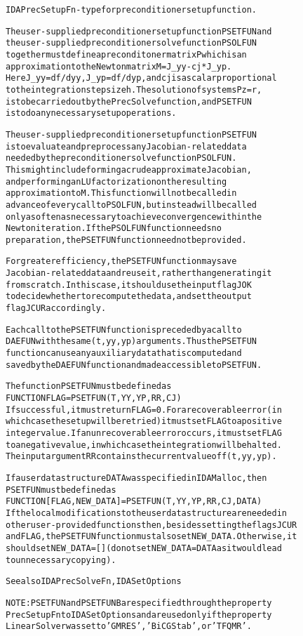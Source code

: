 \begin{alltt}
IDAPrecSetupFn - type for preconditioner setup function.

   The user-supplied preconditioner setup function PSETFUN and
   the user-supplied preconditioner solve function PSOLFUN
   together must define a preconditoner matrix P which is an 
   approximation to the Newton matrix M = J_yy - cj*J_yp.  
   Here J_yy = df/dyy, J_yp = df/dyp, and cj is a scalar proportional 
   to the integration step size h.  The solution of systems P z = r,
   is to be carried out by the PrecSolve function, and PSETFUN
   is to do any necessary setup operations.

   The user-supplied preconditioner setup function PSETFUN
   is to evaluate and preprocess any Jacobian-related data
   needed by the preconditioner solve function PSOLFUN.
   This might include forming a crude approximate Jacobian,
   and performing an LU factorization on the resulting
   approximation to M.  This function will not be called in
   advance of every call to PSOLFUN, but instead will be called
   only as often as necessary to achieve convergence within the
   Newton iteration.  If the PSOLFUN function needs no
   preparation, the PSETFUN function need not be provided.

   For greater efficiency, the PSETFUN function may save
   Jacobian-related data and reuse it, rather than generating it
   from scratch.  In this case, it should use the input flag JOK
   to decide whether to recompute the data, and set the output
   flag JCUR accordingly.

   Each call to the PSETFUN function is preceded by a call to
   DAEFUN with the same (t,yy,yp) arguments.  Thus the PSETFUN
   function can use any auxiliary data that is computed and
   saved by the DAEFUN function and made accessible to PSETFUN.

   The function PSETFUN must be defined as 
        FUNCTION FLAG = PSETFUN(T,YY,YP,RR,CJ)
   If successful, it must return FLAG=0. For a recoverable error (in    
   which case the setup will be retried) it must set FLAG to a positive
   integer value. If an unrecoverable error occurs, it must set FLAG
   to a negative value, in which case the integration will be halted.
   The input argument RR contains the current value of f(t,yy,yp).

   If a user data structure DATA was specified in IDAMalloc, then
   PSETFUN must be defined as
        FUNCTION [FLAG,NEW_DATA] = PSETFUN(T,YY,YP,RR,CJ,DATA)
   If the local modifications to the user data structure are needed in
   other user-provided functions then, besides setting the flags JCUR
   and FLAG, the PSETFUN function must also set NEW_DATA. Otherwise, it 
   should set NEW_DATA=[] (do not set NEW_DATA = DATA as it would lead
   to unnecessary copying).

   See also IDAPrecSolveFn, IDASetOptions

   NOTE: PSETFUN and PSETFUNB are specified through the property
   PrecSetupFn to IDASetOptions and are used only if the property
   LinearSolver was set to 'GMRES', 'BiCGStab', or 'TFQMR'.
\end{alltt}






\vspace{0.1in}